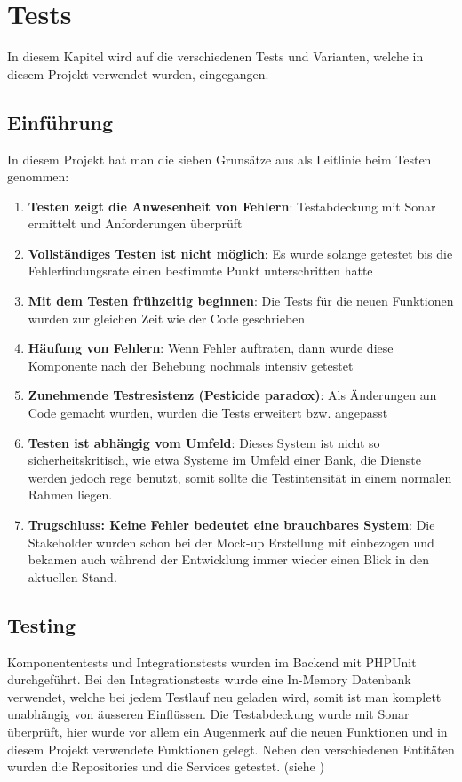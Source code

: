 %
%

\chapter{Tests}\label{chap.tests} 
In diesem Kapitel wird auf die verschiedenen Tests und Varianten, welche in diesem Projekt verwendet wurden, eingegangen.

\section{Einführung}
In diesem Projekt hat man die sieben Grunsätze aus \cite{test_soft_book} als Leitlinie beim Testen genommen:
\begin{enumerate}
\item \textbf{Testen zeigt die Anwesenheit von Fehlern}: Testabdeckung mit Sonar ermittelt und Anforderungen überprüft
\item \textbf{Vollständiges Testen ist nicht möglich}: Es wurde solange getestet bis die Fehlerfindungsrate einen bestimmte Punkt unterschritten hatte
\item \textbf{Mit dem Testen frühzeitig beginnen}: Die Tests für die neuen Funktionen wurden zur gleichen Zeit wie der Code geschrieben
\item \textbf{Häufung von Fehlern}: Wenn Fehler auftraten, dann wurde diese Komponente nach der Behebung nochmals intensiv getestet
\item \textbf{Zunehmende Testresistenz (Pesticide paradox)}: Als Änderungen am Code gemacht wurden, wurden die Tests erweitert bzw. angepasst
\item \textbf{Testen ist abhängig vom Umfeld}: Dieses System ist nicht so sicherheitskritisch, wie etwa Systeme im Umfeld einer Bank, die Dienste werden jedoch rege benutzt, somit sollte die Testintensität in einem normalen Rahmen liegen.
\item \textbf{Trugschluss: Keine Fehler bedeutet eine brauchbares System}: Die Stakeholder wurden schon bei der Mock-up Erstellung mit einbezogen und bekamen auch während der Entwicklung immer wieder einen Blick in den aktuellen Stand.
\end{enumerate}

\section{Testing}
Komponententests und Integrationstests wurden im Backend mit PHPUnit durchgeführt. Bei den Integrationstests wurde eine In-Memory Datenbank verwendet, welche bei jedem Testlauf neu geladen wird, somit ist man komplett unabhängig von äusseren Einflüssen. Die Testabdeckung wurde mit Sonar überprüft, hier wurde vor allem ein Augenmerk auf die neuen Funktionen und in diesem Projekt verwendete Funktionen gelegt. Neben den verschiedenen Entitäten wurden die Repositories und die Services getestet. (siehe \cite{test_soft_book})

